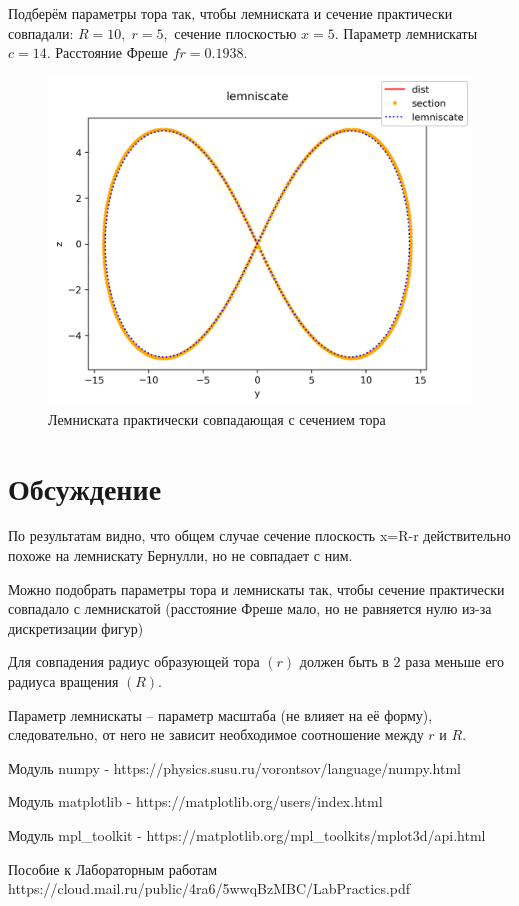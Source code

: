 \documentclass[a4]{article}
\begin{document}
Подберём параметры тора так, чтобы лемниската и сечение практически совпадали:
$R=10,\; r = 5,$ сечение плоскостью $x=5.$ Параметр лемнискаты $c=14.$ Расстояние Фреше $fr = 0.1938.$

\begin{figure}[H]
\caption{Лемниската практически совпадающая с сечением тора }
\includegraphics[scale=0.9]{lemniscate.png} 
\end{figure}

\section{Обсуждение}
По результатам видно, что общем случае сечение плоскость x=R-r действительно похоже на лемнискату Бернулли, но не совпадает с ним.

Можно подобрать параметры тора и лемнискаты так, чтобы сечение практически совпадало с лемнискатой (расстояние Фреше мало, но не равняется нулю из-за дискретизации фигур)

Для совпадения радиус образующей тора $(r)$ должен быть в $2$ раза меньше его радиуса вращения $(R).$

Параметр лемнискаты – параметр масштаба (не влияет на её форму), следовательно, от него не зависит необходимое соотношение между $r$ и $R.$

\begin{thebibliography}{}
      Модуль numpy  -  https://physics.susu.ru/vorontsov/language/numpy.html
    
    Модуль matplotlib - https://matplotlib.org/users/index.html
    
    Модуль mpl\_toolkit - https://matplotlib.org/mpl\_toolkits/mplot3d/api.html
    
    Пособие к Лабораторным работам https://cloud.mail.ru/public/4ra6/5wwqBzMBC/LabPractics.pdf
\end{thebibliography}
\end{document}
